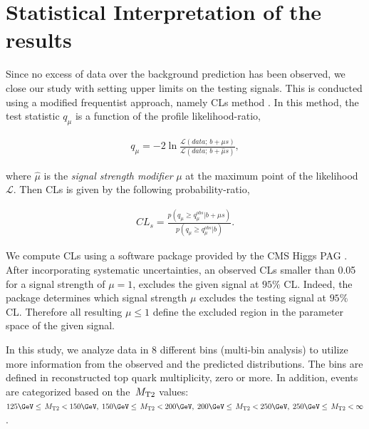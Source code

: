 
\section[Statistics]{Statistical Interpretation of the results}\label{sect:stat}

Since no excess of data over the background prediction has been observed, 
we close our study with setting upper limits on the testing signals.
This is conducted using a modified frequentist approach, namely CLs method \cite{read:CLs}.
In this method, the test statistic $q_\mu$ \cite{cowan:asymptoticCLs} is a function of the profile likelihood-ratio,

\begin{align}
q_\mu = -2 \ln \frac{\mathcal{L}(data ;\, b + \mu s)}{\mathcal{L}(data ;\, b + \hat{\mu} s)},
\end{align}

where $\hat\mu$ is the \textit{signal strength modifier} $\mu$ at the maximum point of the likelihood $\mathcal{L}$.
Then CLs is given by the following probability-ratio,

\begin{align}
CL_s = \frac{p(q_\mu \geq q_\mu^{obs} | b + \mu s )}{p(q_\mu \geq q_\mu^{obs} | b)}.
\end{align}
 
We compute CLs using a software package provided by the CMS Higgs PAG \cite{higgspag:software}.
After incorporating systematic uncertainties, an observed CLs smaller than 0.05 for a signal strength of $\mu = 1$, excludes the given signal at $95\%$ CL. Indeed, the package determines which signal strength $\mu$ excludes the testing signal at $95\%$ CL. Therefore all resulting $\mu \leq 1$ define the excluded region in the parameter space of the given signal. 

In this study, we analyze data in 8 different bins (multi-bin analysis) to utilize more information from 
the observed and the predicted distributions.
The bins are defined in reconstructed top quark multiplicity, zero or more. In addition, events are categorized based on the $\,{M_{\rm T2}}$ values: $125\GeV \leq \mttwo < 150\GeV,\; 150\GeV \leq \mttwo < 200\GeV,\; 200\GeV \leq \mttwo < 250\GeV,\; 250\GeV \leq \mttwo < \infty$.

